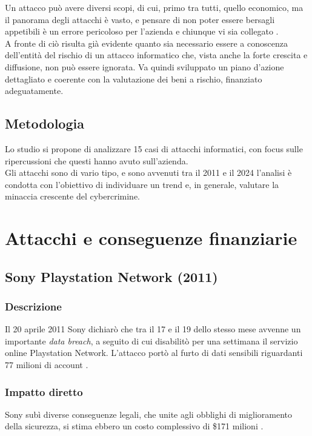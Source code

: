 \documentclass[12pt,a4paper,twoside]{report}
\begin{document}
Un attacco pu\`o avere diversi scopi, di cui, primo tra tutti, quello economico, ma il panorama degli attacchi \`e vasto, e pensare di non poter essere bersagli appetibili \`e un errore pericoloso per l'azienda e chiunque vi sia collegato \cite{enisa_threat_landscape}.\\
A fronte di ci\`o risulta gi\`a evidente quanto sia necessario essere a conoscenza dell'entit\`a del rischio di un attacco informatico che, vista anche la forte crescita e diffusione, non pu\`o essere ignorata. Va quindi sviluppato un piano d'azione dettagliato e coerente con la valutazione dei beni a rischio, finanziato adeguatamente.\\

\section{Metodologia}
Lo studio si propone di analizzare 15 casi di attacchi informatici, con focus sulle ripercussioni che questi hanno avuto sull'azienda.\\
Gli attacchi sono di vario tipo, e sono avvenuti tra il 2011 e il 2024 l'analisi \`e condotta con l'obiettivo di individuare un trend e, in generale, valutare la minaccia crescente del cybercrimine.\\  
\newpage



\chapter{Attacchi e conseguenze finanziarie}\label{chap:attacks}

\section{Sony Playstation Network (2011)}
\subsection{Descrizione}
Il 20 aprile 2011 Sony dichiar\`o che tra il 17 e il 19 dello stesso mese avvenne un importante \textit{data breach}, a seguito di cui disabilit\`o per una settimana il servizio online Playstation Network. L'attacco port\`o al furto di dati sensibili riguardanti 77 milioni di account \cite{Sony_PNT_guardian}\cite{Sony_pnt}.\\
\subsection{Impatto diretto}
Sony sub\`i diverse conseguenze legali, che unite agli obblighi di miglioramento della sicurezza, si stima ebbero un costo complessivo di \$171 milioni \cite{Sony_pnt}.\\
\end{document}
